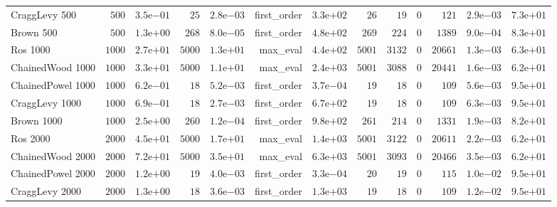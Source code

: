 \begin{longtable}[c]{lrrrrrrrrrrrr}
CraggLevy 500 & \(  500\) & \( 3.5\)e\(-01\) & \(   25\) & \( 2.8\)e\(-03\) & first\_order & \( 3.3\)e\(+02\) & \(   26\) & \(   19\) & \(    0\) & \(  121\) & \( 2.9\)e\(-03\) & \( 7.3\)e\(+01\) \\
Brown 500 & \(  500\) & \( 1.3\)e\(+00\) & \(  268\) & \( 8.0\)e\(-05\) & first\_order & \( 4.8\)e\(+02\) & \(  269\) & \(  224\) & \(    0\) & \( 1389\) & \( 9.0\)e\(-04\) & \( 8.3\)e\(+01\) \\
Ros 1000 & \( 1000\) & \( 2.7\)e\(+01\) & \( 5000\) & \( 1.3\)e\(+01\) & max\_eval & \( 4.4\)e\(+02\) & \( 5001\) & \( 3132\) & \(    0\) & \(20661\) & \( 1.3\)e\(-03\) & \( 6.3\)e\(+01\) \\
ChainedWood 1000 & \( 1000\) & \( 3.3\)e\(+01\) & \( 5000\) & \( 1.1\)e\(+01\) & max\_eval & \( 2.4\)e\(+03\) & \( 5001\) & \( 3088\) & \(    0\) & \(20441\) & \( 1.6\)e\(-03\) & \( 6.2\)e\(+01\) \\
ChainedPowel 1000 & \( 1000\) & \( 6.2\)e\(-01\) & \(   18\) & \( 5.2\)e\(-03\) & first\_order & \( 3.7\)e\(-04\) & \(   19\) & \(   18\) & \(    0\) & \(  109\) & \( 5.6\)e\(-03\) & \( 9.5\)e\(+01\) \\
CraggLevy 1000 & \( 1000\) & \( 6.9\)e\(-01\) & \(   18\) & \( 2.7\)e\(-03\) & first\_order & \( 6.7\)e\(+02\) & \(   19\) & \(   18\) & \(    0\) & \(  109\) & \( 6.3\)e\(-03\) & \( 9.5\)e\(+01\) \\
Brown 1000 & \( 1000\) & \( 2.5\)e\(+00\) & \(  260\) & \( 1.2\)e\(-04\) & first\_order & \( 9.8\)e\(+02\) & \(  261\) & \(  214\) & \(    0\) & \( 1331\) & \( 1.9\)e\(-03\) & \( 8.2\)e\(+01\) \\
Ros 2000 & \( 2000\) & \( 4.5\)e\(+01\) & \( 5000\) & \( 1.7\)e\(+01\) & max\_eval & \( 1.4\)e\(+03\) & \( 5001\) & \( 3122\) & \(    0\) & \(20611\) & \( 2.2\)e\(-03\) & \( 6.2\)e\(+01\) \\
ChainedWood 2000 & \( 2000\) & \( 7.2\)e\(+01\) & \( 5000\) & \( 3.5\)e\(+01\) & max\_eval & \( 6.3\)e\(+03\) & \( 5001\) & \( 3093\) & \(    0\) & \(20466\) & \( 3.5\)e\(-03\) & \( 6.2\)e\(+01\) \\
ChainedPowel 2000 & \( 2000\) & \( 1.2\)e\(+00\) & \(   19\) & \( 4.0\)e\(-03\) & first\_order & \( 3.3\)e\(-04\) & \(   20\) & \(   19\) & \(    0\) & \(  115\) & \( 1.0\)e\(-02\) & \( 9.5\)e\(+01\) \\
CraggLevy 2000 & \( 2000\) & \( 1.3\)e\(+00\) & \(   18\) & \( 3.6\)e\(-03\) & first\_order & \( 1.3\)e\(+03\) & \(   19\) & \(   18\) & \(    0\) & \(  109\) & \( 1.2\)e\(-02\) & \( 9.5\)e\(+01\) \\

\end{longtable}
